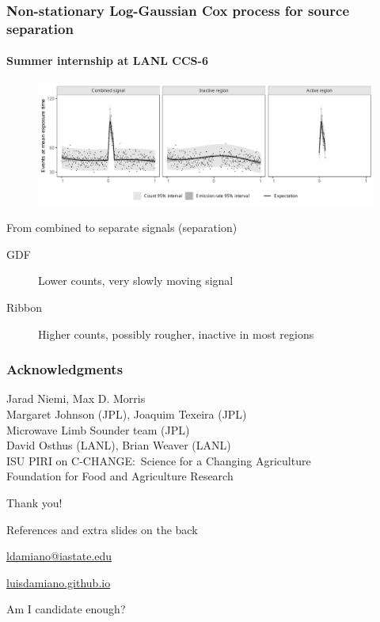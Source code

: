 \documentclass{snedecorbeamer}
\begin{document}
\begin{frame}
  \frametitle{Non-stationary Log-Gaussian Cox process for source separation}
  \framesubtitle{Summer internship at LANL CCS-6}
  \begin{figure}
    \centering
    \includegraphics[width=\textwidth]{inc/application-fit-separation3.pdf}%
  \end{figure}
  {\footnotesize
    From combined to separate signals (separation)
    \begin{description}
    \item[GDF] Lower counts, very slowly moving signal
    \item[Ribbon] Higher counts, possibly rougher, inactive in most regions
    \end{description}
  }
\end{frame}

\begin{frame}[c]
  \frametitle{Acknowledgments}
  \centering

  {\small Jarad Niemi, Max D. Morris\\
    Margaret Johnson (JPL), Joaquim Texeira (JPL) \\
    Microwave Limb Sounder team (JPL)\\
    David Osthus (LANL), Brian Weaver (LANL) \\
    ISU PIRI on C-CHANGE:~Science for a Changing Agriculture\\
    Foundation for Food and Agriculture Research}

  \vfill

  {\huge Thank you!}

  \vfill

  {\tiny References and extra slides on the back}

  \href{ldamiano@iastate.edu}{
    ldamiano@iastate.edu}

  \href{https://luisdamiano.github.io/}{
    luisdamiano.github.io}

  \vfill

  {\tiny Am I candidate enough?}

\end{frame}
\end{document}
